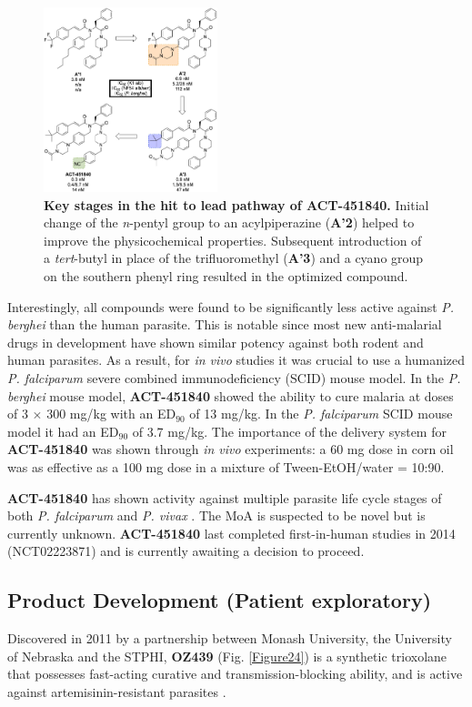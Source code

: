 \documentclass[twocolumn]{bmcart}%
\begin{document}
\begin{figure}[h]
	\includegraphics [width=0.45\textwidth] {Figure23}
	\caption{{\bf Key stages in the hit to lead pathway of ACT-451840.} Initial change of the \textit{n}-pentyl group to an acylpiperazine (\textbf{A'2}) helped to improve the physicochemical properties. Subsequent introduction of a \textit{tert}-butyl in place of the trifluoromethyl (\textbf{A'3}) and a cyano group on the southern phenyl ring resulted in the optimized compound.}
	\label{Figure23}
\end{figure}

Interestingly, all compounds were found to be significantly less active against \textit{P. berghei} than the human parasite. This is notable since most new anti-malarial drugs in development have shown similar potency against both rodent and human parasites. As a result, for \textit{in vivo} studies it was crucial to use a humanized \textit{P. falciparum} severe combined immunodeficiency (SCID) mouse model. In the \textit{P. berghei} mouse model, \textbf{ACT-451840} showed the ability to cure malaria at doses of 3 $\times$ 300 mg/kg with an ED$_{90}$ of 13 mg/kg. In the \textit{P. falciparum} SCID mouse model it had an ED$_{90}$ of 3.7 mg/kg. The importance of the delivery system for \textbf{ACT-451840} was shown through \textit{in vivo} experiments: a 60 mg dose in corn oil was as effective as a 100 mg dose in a mixture of Tween-EtOH/water = 10:90.

\textbf{ACT-451840} has shown activity against multiple parasite life cycle stages of both \textit{P. falciparum} and \textit{P. vivax} \cite{Bihan2016}. The MoA is suspected to be novel but is currently unknown. \textbf{ACT-451840} last completed first-in-human studies in 2014 (NCT02223871) \cite{Krause2016} and is currently awaiting a decision to proceed.

\subsection*{Product Development (Patient exploratory)}
Discovered in 2011 by a partnership between Monash University, the University of Nebraska and the STPHI, \textbf{OZ439} (Fig. \ref{Figure24}) is a synthetic trioxolane that possesses fast-acting curative and transmission-blocking ability, and is active against artemisinin-resistant parasites \cite{Charman2011}.
\end{document}
